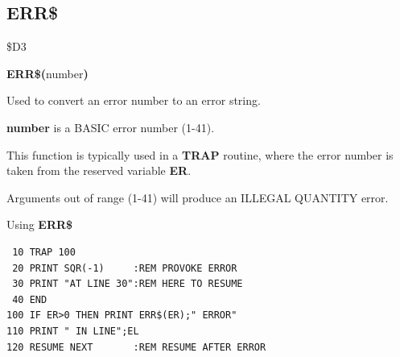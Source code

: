 \subsection{ERR\$}
\begin{description}[leftmargin=2cm,style=nextline]
\item [Token:] \$D3
\item [Format:] {\bf ERR\$(}number{\bf)}
\item [Usage:] Used to convert
               an error number to an error string.

   {\bf number} is a BASIC error number (1-41).

This function is typically used in a {\bf TRAP} routine,
where the error number is taken from the reserved variable {\bf ER}.

\item [Remarks:] Arguments out of range (1-41) will
                 produce an ILLEGAL QUANTITY error.

\item [Example:] Using {\bf ERR\$}
\begin{tcolorbox}[colback=black,coltext=white]
\verbatimfont{\codefont}
\begin{verbatim}
 10 TRAP 100
 20 PRINT SQR(-1)     :REM PROVOKE ERROR
 30 PRINT "AT LINE 30":REM HERE TO RESUME
 40 END
100 IF ER>0 THEN PRINT ERR$(ER);" ERROR"
110 PRINT " IN LINE";EL
120 RESUME NEXT       :REM RESUME AFTER ERROR
\end{verbatim}
\end{tcolorbox}
\end{description}


\newpage
